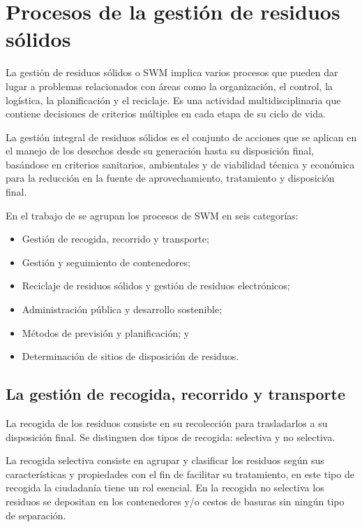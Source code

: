 \section{Procesos de la gestión de residuos sólidos}

La gestión de residuos sólidos o SWM implica varios procesos que pueden dar lugar a problemas relacionados con áreas como la organización, el control, la logística, la planificación y el reciclaje. Es una actividad multidisciplinaria que contiene decisiones de criterios múltiples en cada etapa de su ciclo de vida. 

La gestión integral de residuos sólidos es el conjunto de acciones que se aplican en el manejo de los desechos desde su generación hasta su disposición final, basándose en criterios sanitarios, ambientales y de viabilidad técnica y económica para la reducción en la fuente de aprovechamiento, tratamiento y disposición final.


En el trabajo de \citet{VitorinodeSouzaMelare2017TechnologiesReview} se agrupan los procesos de SWM en seis categorías:
\begin{itemize}
\item Gestión de recogida, recorrido y transporte; 
\item Gestión y seguimiento de contenedores; 
\item Reciclaje de residuos sólidos y gestión de residuos electrónicos;
\item Administración pública y desarrollo sostenible; 
\item Métodos de previsión y planificación; y 
\item Determinación de sitios de disposición de residuos.
\end{itemize}

\subsection{La gestión de recogida, recorrido y transporte}
La recogida de los residuos consiste en su recolección para trasladarlos a su disposición final. Se distinguen dos tipos de recogida: selectiva y no selectiva.

La recogida selectiva consiste en agrupar y clasificar los residuos según sus características y propiedades con el fin de facilitar su tratamiento, en este tipo de recogida la ciudadanía tiene un rol esencial. En la recogida no selectiva los residuos se depositan en los contenedores y/o cestos de basuras sin ningún tipo de separación.


